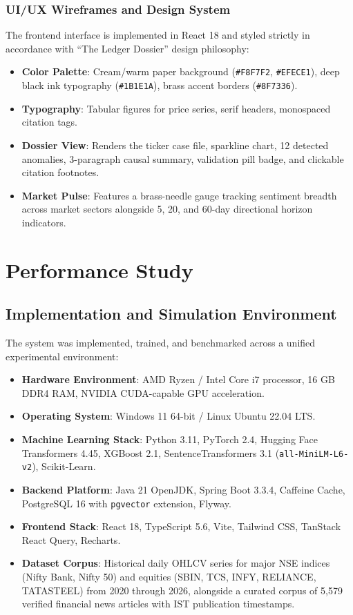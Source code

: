 \documentclass{article}
\begin{document}
	\subsubsection{UI/UX Wireframes and Design System}
	The frontend interface is implemented in React 18 and styled strictly in accordance with ``The Ledger Dossier'' design philosophy:
	\begin{itemize}
		\item \textbf{Color Palette}: Cream/warm paper background (\texttt{\#F8F7F2}, \texttt{\#EFECE1}), deep black ink typography (\texttt{\#1B1E1A}), brass accent borders (\texttt{\#8F7336}).
		\item \textbf{Typography}: Tabular figures for price series, serif headers, monospaced citation tags.
		\item \textbf{Dossier View}: Renders the ticker case file, sparkline chart, 12 detected anomalies, 3-paragraph causal summary, validation pill badge, and clickable citation footnotes.
		\item \textbf{Market Pulse}: Features a brass-needle gauge tracking sentiment breadth across market sectors alongside 5, 20, and 60-day directional horizon indicators.
	\end{itemize}

	\pagebreak
	\section{Performance Study}

	\subsection{Implementation and Simulation Environment}

	The system was implemented, trained, and benchmarked across a unified experimental environment:
	\begin{itemize}
		\item \textbf{Hardware Environment}: AMD Ryzen / Intel Core i7 processor, 16 GB DDR4 RAM, NVIDIA CUDA-capable GPU acceleration.
		\item \textbf{Operating System}: Windows 11 64-bit / Linux Ubuntu 22.04 LTS.
		\item \textbf{Machine Learning Stack}: Python 3.11, PyTorch 2.4, Hugging Face Transformers 4.45, XGBoost 2.1, SentenceTransformers 3.1 (\texttt{all-MiniLM-L6-v2}), Scikit-Learn.
		\item \textbf{Backend Platform}: Java 21 OpenJDK, Spring Boot 3.3.4, Caffeine Cache, PostgreSQL 16 with \texttt{pgvector} extension, Flyway.
		\item \textbf{Frontend Stack}: React 18, TypeScript 5.6, Vite, Tailwind CSS, TanStack React Query, Recharts.
		\item \textbf{Dataset Corpus}: Historical daily OHLCV series for major NSE indices (Nifty Bank, Nifty 50) and equities (SBIN, TCS, INFY, RELIANCE, TATASTEEL) from 2020 through 2026, alongside a curated corpus of 5,579 verified financial news articles with IST publication timestamps.
	\end{itemize}
\end{document}
